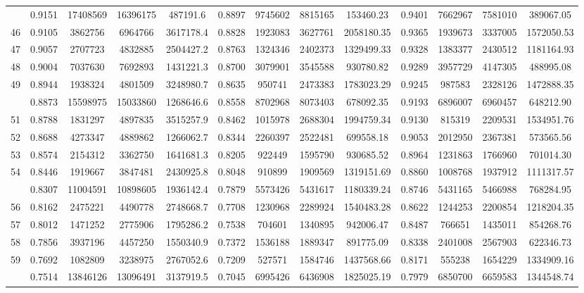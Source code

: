 \documentclass[
  12pt,
]{article}
\begin{document}
\begin{longtable}[t]{lcccccccccccc}
\addlinespace
45 & 0.9151 & 17408569 & 16396175 & 487191.6 & 0.8897 & 9745602 & 8815165 & 153460.23 & 0.9401 & 7662967 & 7581010 & 389067.05\\
46 & 0.9105 & 3862756 & 6964766 & 3617178.4 & 0.8828 & 1923083 & 3627761 & 2058180.35 & 0.9365 & 1939673 & 3337005 & 1572050.53\\
47 & 0.9057 & 2707723 & 4832885 & 2504427.2 & 0.8763 & 1324346 & 2402373 & 1329499.33 & 0.9328 & 1383377 & 2430512 & 1181164.93\\
48 & 0.9004 & 7037630 & 7692893 & 1431221.3 & 0.8700 & 3079901 & 3545588 & 930780.82 & 0.9289 & 3957729 & 4147305 & 488995.08\\
49 & 0.8944 & 1938324 & 4801509 & 3248980.7 & 0.8635 & 950741 & 2473383 & 1783023.29 & 0.9245 & 987583 & 2328126 & 1472888.35\\
\addlinespace
50 & 0.8873 & 15598975 & 15033860 & 1268646.6 & 0.8558 & 8702968 & 8073403 & 678092.35 & 0.9193 & 6896007 & 6960457 & 648212.90\\
51 & 0.8788 & 1831297 & 4897835 & 3515257.9 & 0.8462 & 1015978 & 2688304 & 1994759.34 & 0.9130 & 815319 & 2209531 & 1534951.76\\
52 & 0.8688 & 4273347 & 4889862 & 1266062.7 & 0.8344 & 2260397 & 2522481 & 699558.18 & 0.9053 & 2012950 & 2367381 & 573565.56\\
53 & 0.8574 & 2154312 & 3362750 & 1641681.3 & 0.8205 & 922449 & 1595790 & 930685.52 & 0.8964 & 1231863 & 1766960 & 701014.30\\
54 & 0.8446 & 1919667 & 3847481 & 2430925.8 & 0.8048 & 910899 & 1909569 & 1319151.69 & 0.8860 & 1008768 & 1937912 & 1111317.57\\
\addlinespace
55 & 0.8307 & 11004591 & 10898605 & 1936142.4 & 0.7879 & 5573426 & 5431617 & 1180339.24 & 0.8746 & 5431165 & 5466988 & 768284.95\\
56 & 0.8162 & 2475221 & 4490778 & 2748668.7 & 0.7708 & 1230968 & 2289924 & 1540483.28 & 0.8622 & 1244253 & 2200854 & 1218204.35\\
57 & 0.8012 & 1471252 & 2775906 & 1795286.2 & 0.7538 & 704601 & 1340895 & 942006.47 & 0.8487 & 766651 & 1435011 & 854268.76\\
58 & 0.7856 & 3937196 & 4457250 & 1550340.9 & 0.7372 & 1536188 & 1889347 & 891775.09 & 0.8338 & 2401008 & 2567903 & 622346.73\\
59 & 0.7692 & 1082809 & 3238975 & 2767052.6 & 0.7209 & 527571 & 1584746 & 1437568.66 & 0.8171 & 555238 & 1654229 & 1334909.16\\
\addlinespace
60 & 0.7514 & 13846126 & 13096491 & 3137919.5 & 0.7045 & 6995426 & 6436908 & 1825025.19 & 0.7979 & 6850700 & 6659583 & 1344548.74\\

\end{longtable}
\end{document}
